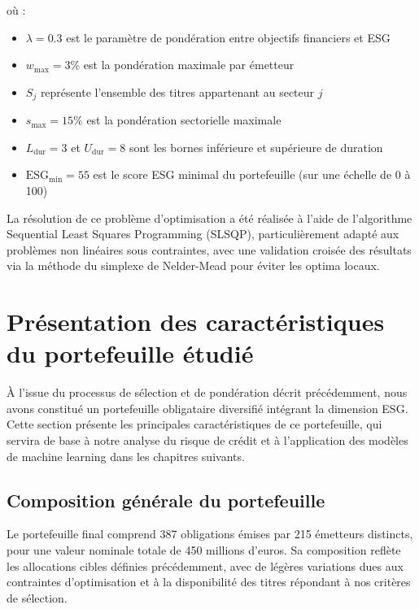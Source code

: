 où :
\begin{itemize}
    \item $\lambda = 0.3$ est le paramètre de pondération entre objectifs financiers et ESG
    \item $w_{\text{max}} = 3\%$ est la pondération maximale par émetteur
    \item $S_j$ représente l'ensemble des titres appartenant au secteur $j$
    \item $s_{\text{max}} = 15\%$ est la pondération sectorielle maximale
    \item $L_{\text{dur}} = 3$ et $U_{\text{dur}} = 8$ sont les bornes inférieure et supérieure de duration
    \item $\text{ESG}_{\text{min}} = 55$ est le score ESG minimal du portefeuille (sur une échelle de 0 à 100)
\end{itemize}

La résolution de ce problème d'optimisation a été réalisée à l'aide de l'algorithme Sequential Least Squares Programming (SLSQP), particulièrement adapté aux problèmes non linéaires sous contraintes, avec une validation croisée des résultats via la méthode du simplexe de Nelder-Mead pour éviter les optima locaux.

\section{Présentation des caractéristiques du portefeuille étudié}

À l'issue du processus de sélection et de pondération décrit précédemment, nous avons constitué un portefeuille obligataire diversifié intégrant la dimension ESG. Cette section présente les principales caractéristiques de ce portefeuille, qui servira de base à notre analyse du risque de crédit et à l'application des modèles de machine learning dans les chapitres suivants.

\subsection{Composition générale du portefeuille}

Le portefeuille final comprend 387 obligations émises par 215 émetteurs distincts, pour une valeur nominale totale de 450 millions d'euros. Sa composition reflète les allocations cibles définies précédemment, avec de légères variations dues aux contraintes d'optimisation et à la disponibilité des titres répondant à nos critères de sélection.

